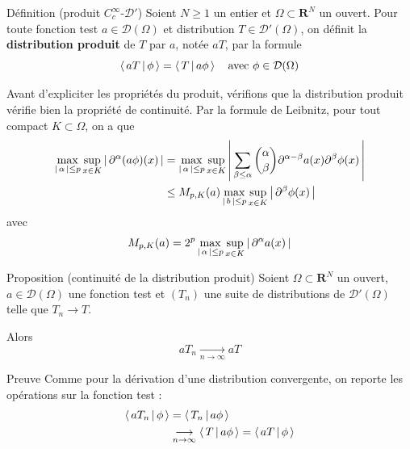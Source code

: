         \begin{omed}{Définition (produit $C^{\infty}_c$-$\mathcal{D}'$)}
            Soient $N \geq 1$ un entier et $\Omega \subset \mathbf{R}^N$ un ouvert. Pour toute fonction test $a \in \mathcal{D}(\Omega)$ et distribution $T \in \mathcal{D}'(\Omega)$, on définit la \textbf{distribution produit} de $T$ par $a$, notée $aT$, par la formule
            \[ \left< \, aT \, \middle| \, \phi \, \right> = \left< \, T \, \middle| \, a\phi \, \right> \quad \text{avec } \phi \in \mathcal{D}(\Omega) \]   
        \end{omed}

        Avant d’expliciter les propriétés du produit, vérifions que la distribution produit vérifie bien la propriété de continuité. Par la formule de Leibnitz, pour tout compact $K \subset \Omega$, on a que 
        \begin{align*}
            \max_{\left\lvert \, \alpha \, \right\rvert \leq p} \sup_{x \in K} \left\lvert \, \partial^{\alpha}(a \phi)(x) \, \right\rvert 
            &= \max_{\left\lvert \, \alpha \, \right\rvert \leq p} \sup_{x \in K} \left\lvert \, \sum_{\beta \leq \alpha} \binom{\alpha}{\beta} \partial^{\alpha - \beta} a(x) \partial^{\beta} \phi(x) \, \right\rvert \\
            &\leq M_{p,K}(a) \max_{\left\lvert \, b \, \right\rvert \leq p} \sup_{x \in K} \left\lvert \, \partial^{\beta} \phi(x) \, \right\rvert 
        \end{align*}
        avec 
        \[ M_{p,K}(a) = 2^p \max_{\left\lvert \, \alpha \, \right\rvert \leq p} \sup_{x \in K} \left\lvert \, \partial^{\alpha}a(x) \, \right\rvert \]
 
        \begin{omed}{Proposition (continuité de la distribution produit)}
            Soient $\Omega \subset \mathbf{R}^N$ un ouvert, $a \in \mathcal{D}(\Omega)$ une fonction test et $(T_n)$ une suite de distributions de $\mathcal{D}'(\Omega)$ telle que $T_n \to T$. 

            Alors 
            \[ a T_n \underset{n \to \infty}{\longrightarrow} a T \]
        \end{omed}

        \begin{demo}{Preuve}
            Comme pour la dérivation d’une distribution convergente, on reporte les opérations sur la fonction test :
            \begin{align*}
                \left< \, aT_n \, \middle| \, \phi \, \right> 
                &= \left< \, T_n \, \middle| \, a \phi \, \right> \\
                &\underset{n \to \infty}{\longrightarrow} \left< \, T \, \middle| \, a \phi \, \right> = \left< \, aT \, \middle| \, \phi \, \right>
            \end{align*}
        \end{demo}

